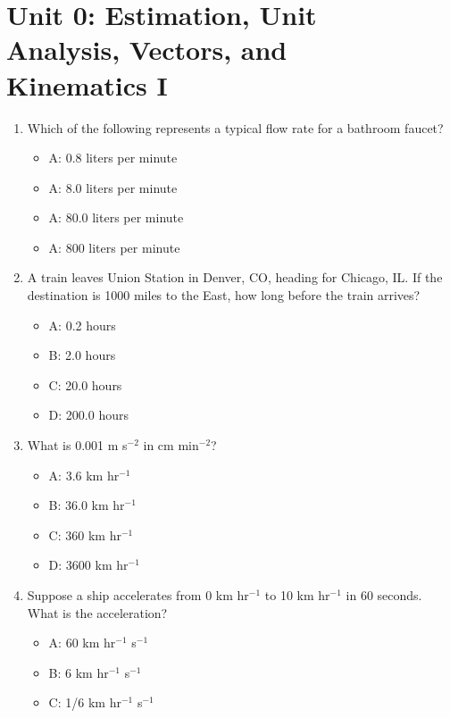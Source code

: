 \documentclass[10pt]{article}
\begin{document}
\twocolumn

\maketitle

\section{Unit 0: Estimation, Unit \\ Analysis, Vectors, and \\ Kinematics I}

\begin{enumerate}
\item Which of the following represents a typical flow rate for a bathroom faucet?
\begin{itemize}
\item A: 0.8 liters per minute
\item A: 8.0 liters per minute
\item A: 80.0 liters per minute
\item A: 800 liters per minute
\end{itemize}
\item A train leaves Union Station in Denver, CO, heading for Chicago, IL.  If the destination is 1000 miles to the East, how long before the train arrives?
\begin{itemize}
\item A: 0.2 hours
\item B: 2.0 hours
\item C: 20.0 hours
\item D: 200.0 hours
\end{itemize}
\item What is 0.001 m s$^{-2}$ in cm min$^{-2}$?
\begin{itemize}
\item A: 3.6 km hr$^{-1}$
\item B: 36.0 km hr$^{-1}$
\item C: 360 km hr$^{-1}$
\item D: 3600 km hr$^{-1}$
\end{itemize}
\item Suppose a ship accelerates from 0 km hr$^{-1}$ to 10 km hr$^{-1}$ in 60 seconds.  What is the acceleration?
\begin{itemize}
\item A: 60 km hr$^{-1}$ s$^{-1}$
\item B: 6 km hr$^{-1}$ s$^{-1}$
\item C: 1/6 km hr$^{-1}$ s$^{-1}$

\end{itemize}
\end{enumerate}
\end{document}
